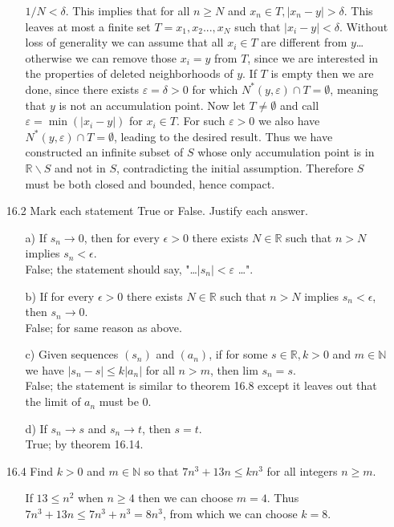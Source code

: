\documentclass[12pt]{article}
\begin{document}
\begin{enumerate}
\begin{enumerate}
$1/N < \delta$. This
implies that for all $n \geq N$ and $x_n \in T, |x_n - y| > \delta$. This leaves at most a finite set
$T = {x_1, x_2..., x_N}$ such that $|x_i - y| < \delta$. Without loss of generality we can assume
that all $x_i \in T$ are different from $y$\ldots otherwise we can remove those $x_i = y$ from $T$,
since we are interested in the properties of deleted neighborhoods of $y$. If $T$ is empty
then we are done, since there exists $\varepsilon = \delta > 0$ for which 
$N^* (y, \varepsilon ) \cap T = \emptyset $, meaning that $y$ is not an accumulation point. 
Now let $T \neq \emptyset$ and call $\varepsilon = \min (|x_i - y|)$ for $x_i \in T$.
For such $\varepsilon > 0$ we also have $N^* (y, \varepsilon) \cap T = \emptyset$, 
leading to the desired result. Thus we
have constructed an infinite subset of $S$ whose only accumulation point is in 
$\mathbb{R}\backslash S$ and
not in $S$, contradicting the initial assumption. Therefore $S$ must be both closed and
bounded, hence compact.
\end{enumerate}

\item[16.2] Mark each statement True or False. Justify each answer.
\begin{enumerate}
\item[a)] If $s_n \rightarrow 0$, then for every $\epsilon > 0$ there exists $N \in \mathbb{R}$ such that $n > N$ implies $s_n < \epsilon$. \\
False; the statement should say, "\ldots $|s_n| < \varepsilon$ \ldots ".
\item[b)] If for every $\epsilon > 0$ there exists $N \in \mathbb{R}$ such that $n > N$ implies $s_n < \epsilon$, then $s_n \rightarrow 0$. \\
False; for same reason as above.
\item[c)] Given sequences $(s_n)$ and $(a_n)$, if for some $s \in \mathbb{R}, k > 0$ and $m \in \mathbb{N}$ we have $|s_n - s| \leq k|a_n|$ for all $n > m$, then lim $s_n = s$. \\
False; the statement is similar to theorem 16.8 except it
leaves out that the limit of $a_n$ must be $0$. 
\item[d)] If $s_n \rightarrow s$ and $s_n \rightarrow t$, then $s = t$. \\
True; by theorem 16.14.
\end{enumerate}

\item[16.4] Find $k > 0$ and $m \in \mathbb{N}$ so that $7n^3 + 13n \leq kn^3$ for all integers $n \geq m$.
\begin{enumerate}
\item[] If $13 \leq n^2$ when $n \geq 4$ then we can choose $m = 4$. Thus \\
$7n^3 + 13n \leq 7n^3 + n^3 = 8n^3$, from which we can choose $k = 8$.
\end{enumerate}


\end{enumerate}
\end{document}
